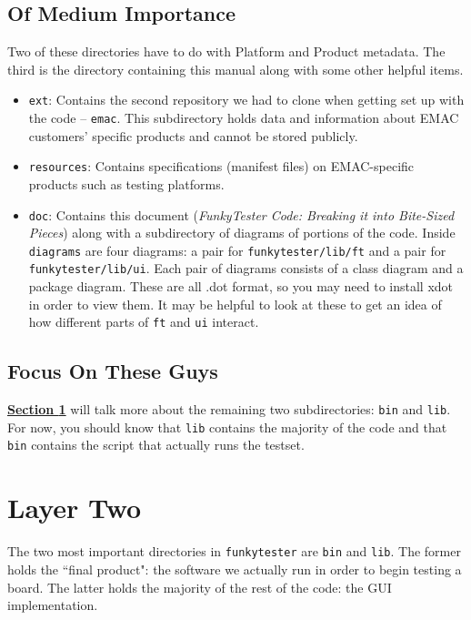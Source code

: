 \documentclass{report}
\begin{document}
\subsection{Of Medium Importance} \label{subsec:medium}
Two of these directories have to do with Platform and Product metadata. The third is the directory containing this manual along with some other helpful items.
\begin{itemize}
	\item \texttt{ext}: Contains the second repository we had to clone when getting set up with the code -- \texttt{emac}. This subdirectory holds data and information about EMAC customers' specific products and cannot be stored publicly.
	\item \texttt{resources}: Contains specifications (manifest files) on EMAC-specific products such as testing platforms.
	\item \texttt{doc}: Contains this document (\textit{FunkyTester Code: Breaking it into Bite-Sized Pieces}) along with a subdirectory of diagrams of portions of the code. Inside \texttt{diagrams} are four diagrams: a pair for \texttt{funkytester/lib/ft} and a pair for \texttt{funkytester/lib/ui}. Each pair of diagrams consists of a class diagram and a package diagram. These are all .dot format, so you may need to install xdot in order to view them. It may be helpful to look at these to get an idea of how different parts of \texttt{ft} and \texttt{ui} interact.
\end{itemize}

\subsection{Focus On These Guys}
\hyperref[sec:layer2]{\textbf{Section \ref{sec:layer2}}} will talk more about the remaining two subdirectories: \texttt{bin} and \texttt{lib}. For now, you should know that \texttt{lib} contains the majority of the code and that \texttt{bin} contains the script that actually runs the testset.

\section{Layer Two} \label{sec:layer2}
The two most important directories in \texttt{funkytester} are \texttt{bin} and \texttt{lib}. The former holds the ``final product": the software we actually run in order to begin testing a board. The latter holds the majority of the rest of the code: the GUI implementation.
\end{document}
